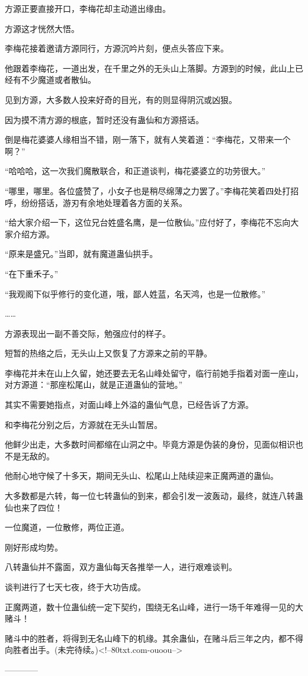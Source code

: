 \begin{this_body}
方源正要直接开口，李梅花却主动道出缘由。

方源这才恍然大悟。

李梅花接着邀请方源同行，方源沉吟片刻，便点头答应下来。

他跟着李梅花，一道出发，在千里之外的无头山上落脚。方源到的时候，此山上已经有不少魔道或者散仙。

见到方源，大多数人投来好奇的目光，有的则显得阴沉或凶狠。

因为摸不清方源的根底，暂时还没有蛊仙和方源搭话。

倒是梅花婆婆人缘相当不错，刚一落下，就有人笑着道：“李梅花，又带来一个啊？”

“哈哈哈，这一次我们魔散联合，和正道谈判，梅花婆婆立的功劳很大。”

“哪里，哪里。各位盛赞了，小女子也是稍尽绵薄之力罢了。”李梅花笑着四处打招呼，纷纷搭话，游刃有余地处理着各方面的关系。

“给大家介绍一下，这位兄台姓盛名鹰，是一位散仙。”应付好了，李梅花不忘向大家介绍方源。

“原来是盛兄。”当即，就有魔道蛊仙拱手。

“在下重禾子。”

“我观阁下似乎修行的变化道，哦，鄙人姓蓝，名天鸿，也是一位散修。”

……

方源表现出一副不善交际，勉强应付的样子。

短暂的热络之后，无头山上又恢复了方源来之前的平静。

李梅花并未在山上久留，她还要去无名山峰处留守，临行前她手指着对面一座山，对方源道：“那座松尾山，就是正道蛊仙的营地。”

其实不需要她指点，对面山峰上外溢的蛊仙气息，已经告诉了方源。

和李梅花分别之后，方源就在无头山暂居。

他鲜少出走，大多数时间都缩在山洞之中。毕竟方源是伪装的身份，见面似相识也不是无敌的。

他耐心地守候了十多天，期间无头山、松尾山上陆续迎来正魔两道的蛊仙。

大多数都是六转，每一位七转蛊仙的到来，都会引发一波轰动，最终，就连八转蛊仙也来了四位！

一位魔道，一位散修，两位正道。

刚好形成均势。

八转蛊仙并不露面，双方蛊仙每天各推举一人，进行艰难谈判。

谈判进行了七天七夜，终于大功告成。

正魔两道，数十位蛊仙统一定下契约，围绕无名山峰，进行一场千年难得一见的大赌斗！

赌斗中的胜者，将得到无名山峰下的机缘。其余蛊仙，在赌斗后三年之内，都不得向胜者出手。(未完待续。)<!--80txt.com-ouoou-->

------------

\end{this_body}

